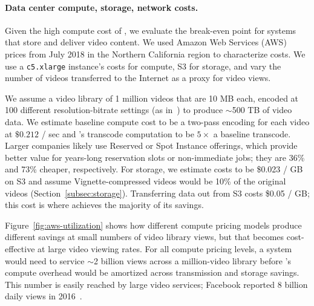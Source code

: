 \paragraph{Data center compute, storage, network costs. }
Given the high compute cost of \name, we evaluate the break-even point for systems that store and deliver video content.
We used Amazon Web Services (AWS) prices from July 2018 in the Northern California region to characterize costs.
We use a \texttt{c5.xlarge} instance's costs for compute, S3 for storage, and vary the number of videos transferred to the Internet as a proxy for video views.

\awsBreakevenFigure


We assume a video library of 1 million videos that are 10 MB each, encoded at 100 different resolution-bitrate settings (as in~\cite{huang2017sve,netflix2018dynamicopt}) to produce $\sim$500 TB of video data.
We estimate baseline compute cost to be a two-pass encoding for each video at $\$0.212$ / sec and \name's transcode computation to be $5\times$ a baseline transcode.
Larger companies likely use Reserved or Spot Instance offerings, which provide better value for years-long reservation slots or non-immediate jobs; they are 36\% and 73\% cheaper, respectively.
For storage, we estimate costs to be \$0.023 / GB on S3 and assume Vignette-compressed videos would be 10\% of the original videos (Section~\ref{subsec:storage}).
Transferring data out from S3 costs \$0.05 / GB; this cost is where \name achieves the majority of its savings.



Figure~\ref{fig:aws-utilization} shows how different compute pricing models produce different savings at small numbers of video library views, but that \name becomes cost-effective at large video viewing rates.
For all compute pricing levels, a system would need to service $\sim$2 billion views across a million-video library before \name's compute overhead would be amortized across transmission and storage savings.
This number is easily reached by large video services; Facebook reported 8 billion daily views in 2016~\cite{fbviews}.

\powerFigure


